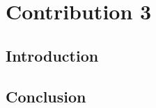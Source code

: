\cleardoublepage
\chapter{Contribution 3}\label{sec:contrib3}

\section{Introduction}



\section{Conclusion}

